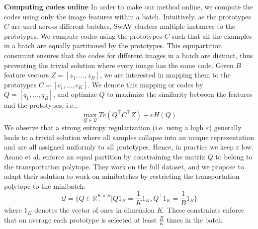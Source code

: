 \documentclass[conference]{IEEEtran}
\begin{document}
\textbf{Computing codes online} In order to make our method online, we compute the codes using only the image features within a batch.
Intuitively, as the prototypes $C$ are used across different batches, SwAV clusters multiple instances to the prototypes.
We compute codes using the prototypes $C$ such that all the examples in a batch are equally partitioned by the prototypes. 
This equipartition constraint ensures that the codes for different images in a batch are distinct, thus preventing the trivial solution where every image has the same code.
Given $B$ feature vectors $Z = [z_1, \ldots, z_B]$, we are interested in mapping them to the prototypes $C = [c_1, \ldots, c_K]$. 
We denote this mapping or codes by $Q = [q_1, \ldots, q_B]$, and optimize $Q$ to maximize the similarity between the features and the prototypes, i.e.,
\begin{equation}
    \max_{Q \in \mathcal{Q}} Tr(Q^{\top}C^{\top}Z) + \varepsilon H(Q) 
\end{equation}
We observe that a strong entropy regularization (i.e. using a high $\varepsilon$) generally leads to a trivial solution where all samples collapse into an unique representation and are all assigned uniformly to all prototypes.
Hence, in practice we keep $\varepsilon$ low. Asano et al. enforce an equal partition by constraining the matrix $Q$ to belong to the transportation polytope. 
They work on the full dataset, and we propose to adapt their solution to work on minibatches by restricting the transportation polytope to the minibatch:
\begin{equation}
    \mathcal{Q} = \{ Q \in \mathbb{R}^{K \times B}_{+} | Q1_{B} = \frac{1}{K}1_K , Q^{\top}1_{K} = \frac{1}{B}1_{B} \}
\end{equation}
where $1_K$ denotes the vector of ones in dimension $K$. These constraints enforce that on average each prototype is selected at least $\frac{B}{K}$ times in the batch.
\end{document}
